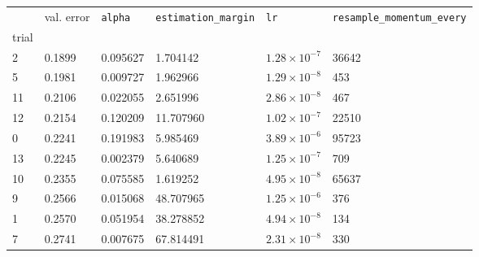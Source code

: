 \begin{tabular}{lp{2.3cm}p{2.3cm}p{2.3cm}p{2.3cm}p{2.3cm}}
\toprule
{} &  val. error &  \texttt{alpha} &  \texttt{estimation\_margin} &         \texttt{lr} &  \texttt{resample\_momentum\_every} \\
trial &             &                 &                              &                     &                                     \\
\midrule
2     &      0.1899 &        0.095627 &                     1.704142 & $1.28\times10^{-7}$ &                               36642 \\
5     &      0.1981 &        0.009727 &                     1.962966 & $1.29\times10^{-8}$ &                                 453 \\
11    &      0.2106 &        0.022055 &                     2.651996 & $2.86\times10^{-8}$ &                                 467 \\
12    &      0.2154 &        0.120209 &                    11.707960 & $1.02\times10^{-7}$ &                               22510 \\
0     &      0.2241 &        0.191983 &                     5.985469 & $3.89\times10^{-6}$ &                               95723 \\
13    &      0.2245 &        0.002379 &                     5.640689 & $1.25\times10^{-7}$ &                                 709 \\
10    &      0.2355 &        0.075585 &                     1.619252 & $4.95\times10^{-8}$ &                               65637 \\
9     &      0.2566 &        0.015068 &                    48.707965 & $1.25\times10^{-6}$ &                                 376 \\
1     &      0.2570 &        0.051954 &                    38.278852 & $4.94\times10^{-8}$ &                                 134 \\
7     &      0.2741 &        0.007675 &                    67.814491 & $2.31\times10^{-8}$ &                                 330 \\
\bottomrule
\end{tabular}
